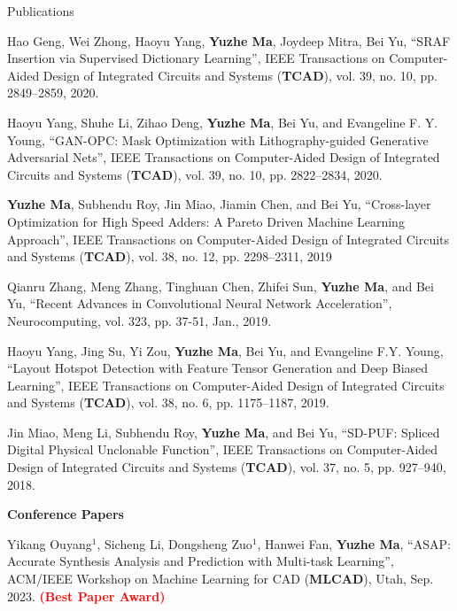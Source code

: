 \begin{rSection}{Publications}
\begin{etaremune}
\item{
     Hao Geng, Wei Zhong, Haoyu Yang, \textbf{Yuzhe Ma}, Joydeep Mitra, Bei Yu,
        ``SRAF Insertion via Supervised Dictionary Learning'',
        IEEE Transactions on Computer-Aided Design of Integrated Circuits and Systems (\textbf{TCAD}), vol. 39, no. 10, pp. 2849--2859, 2020.
}

\item{
    Haoyu Yang, Shuhe Li, Zihao Deng, \textbf{Yuzhe Ma}, Bei Yu, and Evangeline F. Y. Young,
    ``GAN-OPC: Mask Optimization with Lithography-guided Generative Adversarial Nets'',
     IEEE Transactions on Computer-Aided Design of Integrated Circuits and Systems (\textbf{TCAD}), vol. 39, no. 10, pp. 2822--2834, 2020.
}

\item{
	\textbf{Yuzhe Ma}, Subhendu Roy, Jin Miao, Jiamin Chen, and Bei Yu,
	``Cross-layer Optimization for High Speed Adders: A Pareto Driven Machine Learning Approach'',
    IEEE Transactions on Computer-Aided Design of Integrated Circuits and Systems (\textbf{TCAD}), vol. 38, no. 12, pp. 2298--2311, 2019
}

\item{
	Qianru Zhang, Meng Zhang, Tinghuan Chen, Zhifei Sun, \textbf{Yuzhe Ma}, and Bei Yu,
	``Recent Advances in Convolutional Neural Network Acceleration'',
	Neurocomputing, vol. 323, pp. 37-51, Jan., 2019.
}

\item{
	Haoyu Yang, Jing Su, Yi Zou, \textbf{Yuzhe Ma}, Bei Yu, and Evangeline F.Y. Young,
	``Layout Hotspot Detection with Feature Tensor Generation and Deep Biased Learning'',
	IEEE Transactions on Computer-Aided Design of Integrated Circuits and Systems (\textbf{TCAD}), vol. 38, no. 6, pp. 1175--1187, 2019.
}

\item{
	Jin Miao, Meng Li, Subhendu Roy, \textbf{Yuzhe Ma}, and Bei Yu,
	``SD-PUF: Spliced Digital Physical Unclonable Function'',
	IEEE Transactions on Computer-Aided Design of Integrated Circuits and Systems (\textbf{TCAD}), vol. 37, no. 5, pp. 927--940, 2018.
}
\end{etaremune}


\textbf{Conference Papers}
\begin{etaremune}
	\renewcommand{\labelenumi}{[C\theenumi]}
\item {
	Yikang Ouyang$^1$, Sicheng Li, Dongsheng Zuo$^1$, Hanwei Fan, \textbf{Yuzhe Ma},
	``ASAP: Accurate Synthesis Analysis and Prediction with Multi-task Learning'',
	ACM/IEEE Workshop on Machine Learning for CAD (\textbf{MLCAD}), Utah, Sep. 2023.
	\textcolor{red}{\textbf{(Best Paper Award)}}
}


\end{etaremune}
\end{rSection}
